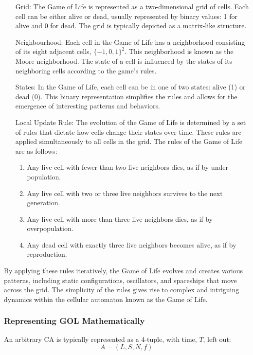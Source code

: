 \begin{enumerate}[align=left]
	\item[Grid:] The Game of Life is represented as a two-dimensional grid of cells. Each cell can be either alive or dead, usually represented by binary values: 1 for alive and 0 for dead. The grid is typically depicted as a matrix-like structure.
	\item[Neighbourhood:] Each cell in the Game of Life has a neighborhood consisting of its eight adjacent cells, $\{-1, 0, 1\}^{2}$. This neighborhood is known as the Moore neighborhood. The state of a cell is influenced by the states of its neighboring cells according to the game's rules.
	\item[States:] In the Game of Life, each cell can be in one of two states: alive (1) or dead (0). This binary representation simplifies the rules and allows for the emergence of interesting patterns and behaviors.
	\item[Local Update Rule:] The evolution of the Game of Life is determined by a set of rules that dictate how cells change their states over time. These rules are applied simultaneously to all cells in the grid. The rules of the Game of Life are as follows:
	\begin{enumerate}
		\item Any live cell with fewer than two live neighbors dies, as if by under population.
		\item Any live cell with two or three live neighbors survives to the next generation.
		\item Any live cell with more than three live neighbors dies, as if by overpopulation.
		\item Any dead cell with exactly three live neighbors becomes alive, as if by reproduction.
	\end{enumerate}
\end{enumerate}

By applying these rules iteratively, the Game of Life evolves and creates various patterns, including static configurations, oscillators, and spaceships that move across the grid. The simplicity of the rules gives rise to complex and intriguing dynamics within the cellular automaton known as the Game of Life.

\subsubsection*{Representing GOL Mathematically}

 An arbitrary CA is typically represented as a 4-tuple, with time, $T$, left out:
\begin{equation} \label{eq:2.1}
	A = (L, S, N, f)
\end{equation}

